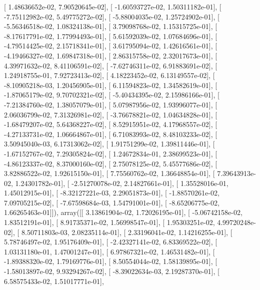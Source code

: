 \documentclass{article}
\begin{document}
       [  1.48636652e-02,   7.90520645e-02],
       [ -1.60593727e-02,   1.50311182e-01],
       [ -7.75112982e-02,   5.49775272e-02],
       [ -5.88004035e-02,   1.25724902e-01],
       [ -5.56346518e-02,   1.08324138e-01],
       [  3.79098768e-02,   1.15315725e-01],
       [ -8.17617791e-02,   1.77994493e-01],
       [  5.61592039e-02,   1.07684696e-01],
       [ -4.79514425e-02,   2.15718341e-01],
       [  3.61795094e-02,   1.42616561e-01],
       [ -4.19466327e-02,   1.69847318e-01],
       [  2.86315758e-02,   2.32017673e-01],
       [  4.39971632e-02,   8.41106591e-02],
       [ -7.62746311e-02,   6.91883691e-02],
       [  1.24918755e-01,   7.92723413e-02],
       [  4.18223452e-02,   6.13149557e-02],
       [ -8.10905218e-03,   1.20456905e-01],
       [  6.11594823e-02,   1.34582619e-01],
       [ -1.87065179e-02,   9.70702321e-02],
       [ -5.40434395e-02,   2.15986166e-01],
       [ -7.21384760e-02,   1.38057079e-01],
       [  5.07987956e-02,   1.93996077e-01],
       [  2.06036799e-02,   7.31326981e-02],
       [ -3.76678821e-02,   1.04634828e-01],
       [ -1.68479207e-02,   5.64368227e-02],
       [  8.52915951e-02,   4.17968557e-02],
       [ -4.27133731e-02,   1.06664867e-01],
       [  6.71083993e-02,   8.48103233e-02],
       [  3.50945040e-03,   6.17313062e-02],
       [  1.91751299e-02,   1.39811446e-01],
       [ -1.67152767e-02,   7.29305824e-02],
       [  1.24672834e-01,   2.38699523e-01],
       [ -4.86123337e-02,   8.37000160e-02],
       [  2.75078125e-02,   5.45577686e-02],
       [  3.82886522e-02,   1.92615150e-01],
       [  7.75560762e-02,   1.36648854e-01],
       [  7.39643913e-02,   1.24301782e-01],
       [ -2.51270078e-02,   2.14827661e-01],
       [  1.35528016e-01,   1.45012915e-01],
       [ -8.32127221e-03,   2.29051873e-01],
       [ -1.88570261e-02,   7.09705215e-02],
       [ -7.67598684e-03,   1.54791001e-01],
       [ -8.65206775e-02,   1.66265463e-01]]), array([[  3.13861904e-02,   1.72026195e-01],
       [ -5.06742158e-02,   1.83512191e-01],
       [  8.91735371e-02,   1.56998547e-01],
       [  1.95303251e-02,   4.99720248e-02],
       [  8.50711803e-03,   2.08235114e-01],
       [  2.33196041e-02,   1.14216255e-01],
       [  5.78746497e-02,   1.95176409e-01],
       [ -2.42327141e-02,   6.83369522e-02],
       [  1.03131180e-01,   1.47001247e-01],
       [  6.97867321e-02,   1.46531482e-01],
       [ -1.89388320e-02,   1.79169776e-01],
       [  8.50554044e-02,   1.58139895e-01],
       [ -1.58013897e-02,   9.93294267e-02],
       [ -8.39022634e-03,   2.19287370e-01],
       [  6.58575433e-02,   1.51017771e-01],
\end{document}
